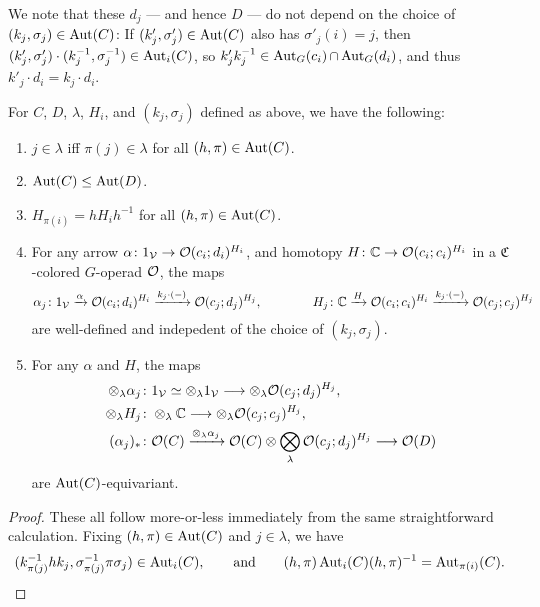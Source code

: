 \documentclass[a4paper,10pt
,draft
]{article}%
\renewcommand{\1}{\eta}%
\begin{document}
\begin{remark}
      We note that these $d_j$ --- and hence $D$ --- do not depend on the choice of $(k_j,\sigma_j) \in \operatorname{Aut}(C)$:
      If $(k'_j, \sigma'_j) \in \operatorname{Aut}(C)$ also has $\sigma'_j(i) = j$, then
      $(k'_j, \sigma'_j) \cdot (k_j^{-1}, \sigma_j^{-1}) \in \operatorname{Aut}_i(C)$,
      so $k'_j k_j^{-1} \in \operatorname{Aut}_G(c_i) \mathop{\cap} \operatorname{Aut}_G(d_i)$,
      and thus $k'_j \cdot d_i = k_j \cdot d_i$.
\end{remark}


\begin{lemma}
      \label{AUTC_LEM}
      For $C$, $D$, $\lambda$, $H_i$, and $(k_j, \sigma_j)$ defined as above, we have the following:
      \begin{enumerate}[label = (\roman*)]
      \item $j \in \lambda$ iff $\pi(j) \in \lambda$ for all $(h,\pi) \in \operatorname{Aut}(C)$.
      \item $\operatorname{Aut}(C) \leq \operatorname{Aut}(D)$.
      \item $H_{\pi(i)} = h H_i h^{-1}$ for all $(h,\pi) \in \operatorname{Aut}(C)$.
      \item For any arrow
            $\alpha \colon 1_{\mathcal V} \to \mathcal{O}(c_i;d_i)^{H_i}$,
            and homotopy
            $H \colon \mathbb C \to \mathcal{O}(c_i;c_i)^{H_i}$
            in a $\mathfrak C$-colored $G$-operad $\mathcal{O}$,
            the maps
            \begin{equation}
                  \alpha_j \colon 1_{\mathcal V} \xrightarrow{\alpha} \mathcal{O}(c_i; d_i)^{H_i} \xrightarrow{ k_j \cdot (-) } \mathcal{O}(c_j; d_j)^{H_j},
                  \qquad \qquad
                  H_j \colon \mathbb C \xrightarrow{H} \mathcal{O}(c_i;c_i)^{H_i} \xrightarrow{k_j \cdot (-)} \mathcal{O}(c_j;c_j)^{H_j}
            \end{equation}
            are well-defined and indepedent of the choice of $(k_j, \sigma_j)$.
      \item For any $\alpha$ and $H$, the maps
            \begin{align*}
              \otimes_\lambda \alpha_j \colon & 1_\V \simeq \otimes_\lambda 1_\V \longto \otimes_\lambda \O(c_j; d_j)^{H_j},
              \\
              \otimes_\lambda H_j \colon & \otimes_\lambda \mathbb C \longto \otimes_\lambda \O(c_j;c_j)^{H_j},
              \\
              (\alpha_j)_{\**} \colon & \O(C) \xrightarrow{\otimes_\lambda \alpha_j} \O(C) \otimes \bigotimes_\lambda \O(c_j; d_j)^{H_j} \longto \O(D)
            \end{align*}
            are $\operatorname{Aut}(C)$-equivariant.
      \end{enumerate}
\end{lemma}
\begin{proof}
      These all follow more-or-less immediately from the same straightforward calculation.
      Fixing $(h,\pi) \in \operatorname{Aut}(C)$ and $j \in \lambda$, we have
      \begin{equation}
            (k_{\pi(j)}^{-1} h k_j, \sigma_{\pi(j)}^{-1} \pi \sigma_j) \in \operatorname{Aut}_i(C),
            \qquad
            \textrm{and}
            \qquad
            (h,\pi) \operatorname{Aut}_i(C) (h,\pi)^{-1} = \operatorname{Aut}_{\pi(i)}(C).
      \end{equation}
\end{proof}
\end{document}

